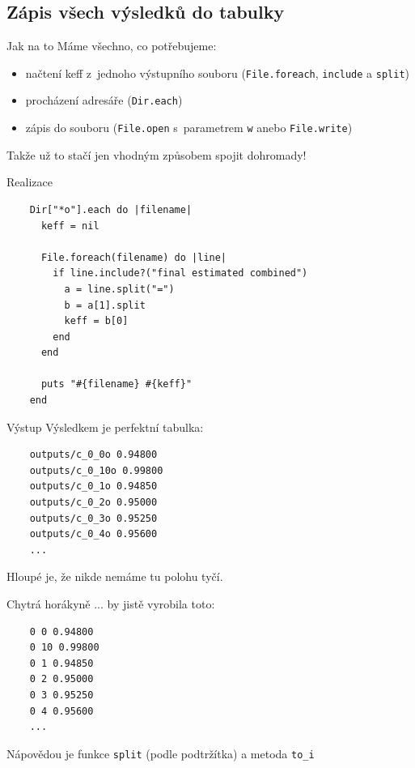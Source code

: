 \documentclass{beamer}
\begin{document}
\subsection{Zápis všech výsledků do tabulky}

\begin{frame}{Jak na to}
  Máme všechno, co potřebujeme:
  \begin{itemize}
    \item načtení keff z~jednoho výstupního souboru (\texttt{File.foreach}, \texttt{include} a \texttt{split})
    \item procházení adresáře (\texttt{Dir.each})
    \item zápis do souboru (\texttt{File.open} s~parametrem \texttt{w} anebo \texttt{File.write})
  \end{itemize}
  Takže už to stačí jen vhodným způsobem spojit dohromady!
\end{frame}

\begin{frame}[fragile]{Realizace}
  \scriptsize
  \begin{verbatim}
    Dir["*o"].each do |filename|
      keff = nil

      File.foreach(filename) do |line|
        if line.include?("final estimated combined")
          a = line.split("=")
          b = a[1].split
          keff = b[0]
        end
      end

      puts "#{filename} #{keff}"
    end
  \end{verbatim}
\end{frame}

\begin{frame}[fragile]{Výstup}
  Výsledkem je perfektní tabulka:
  {\scriptsize
  \begin{verbatim}
    outputs/c_0_0o 0.94800
    outputs/c_0_10o 0.99800
    outputs/c_0_1o 0.94850
    outputs/c_0_2o 0.95000
    outputs/c_0_3o 0.95250
    outputs/c_0_4o 0.95600
    ...
  \end{verbatim}}
  Hloupé je, že nikde nemáme tu polohu tyčí.
\end{frame}


\begin{frame}[fragile]{Chytrá horákyně}
  ... by jistě vyrobila toto:
  {\scriptsize
  \begin{verbatim}
    0 0 0.94800
    0 10 0.99800
    0 1 0.94850
    0 2 0.95000
    0 3 0.95250
    0 4 0.95600
    ...
  \end{verbatim}
  }
  Nápovědou je funkce \texttt{split} (podle podtržítka) a metoda \texttt{to\_i}
\end{frame}
\end{document}
